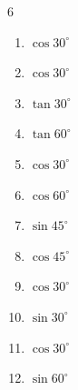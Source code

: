 \begin{multicols}{6}
\begin{enumerate}
  \item $\displaystyle \cos{30^\circ}$


  \item $\displaystyle \cos{30^\circ}$


  \item $\displaystyle \tan{30^\circ}$


  \item $\displaystyle \tan{60^\circ}$


  \item $\displaystyle \cos{30^\circ}$


  \item $\displaystyle \cos{60^\circ}$


  \item $\displaystyle \sin{45^\circ}$


\columnbreak %

  \item $\displaystyle \cos{45^\circ}$


  \item $\displaystyle \cos{30^\circ}$


  \item $\displaystyle \sin{30^\circ}$


  \item $\displaystyle \cos{30^\circ}$


  \item $\displaystyle \sin{60^\circ}$



\end{enumerate}
\end{multicols}
